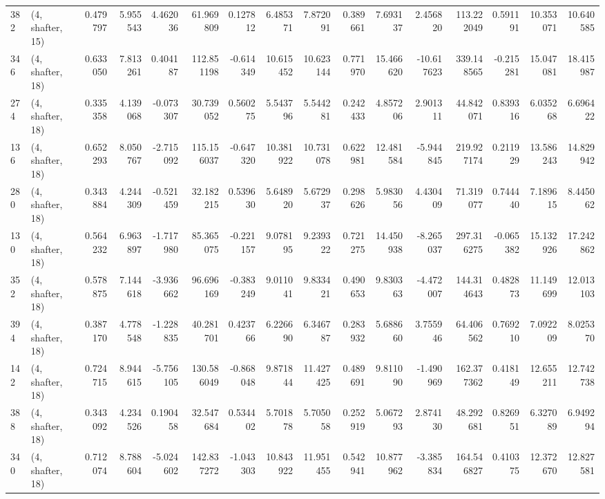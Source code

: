 \begin{tabular}{llrrrrrrrrrrrrrr}
382 &  (4, shafter, 15) &   0.479797 &   5.955543 &   4.462036 &    61.969809 &   0.127812 &   6.485371 &   7.872091 &  0.389661 &   7.693137 &   2.456820 &   113.222049 &  0.591191 &  10.353071 &  10.640585 \\
346 &  (4, shafter, 18) &   0.633050 &   7.813261 &   0.404187 &   112.851198 &  -0.614349 &  10.615452 &  10.623144 &  0.771970 &  15.466620 & -10.617623 &   339.148565 & -0.215281 &  15.047081 &  18.415987 \\
274 &  (4, shafter, 18) &   0.335358 &   4.139068 &  -0.073307 &    30.739052 &   0.560275 &   5.543796 &   5.544281 &  0.242433 &   4.857206 &   2.901311 &    44.842071 &  0.839316 &   6.035268 &   6.696422 \\
136 &  (4, shafter, 18) &   0.652293 &   8.050767 &  -2.715092 &   115.156037 &  -0.647320 &  10.381922 &  10.731078 &  0.622981 &  12.481584 &  -5.944845 &   219.927174 &  0.211929 &  13.586243 &  14.829942 \\
280 &  (4, shafter, 18) &   0.343884 &   4.244309 &  -0.521459 &    32.182215 &   0.539630 &   5.648920 &   5.672937 &  0.298626 &   5.983056 &   4.430409 &    71.319077 &  0.744440 &   7.189615 &   8.445062 \\
130 &  (4, shafter, 18) &   0.564232 &   6.963897 &  -1.717980 &    85.365075 &  -0.221157 &   9.078195 &   9.239322 &  0.721275 &  14.450938 &  -8.265037 &   297.316275 & -0.065382 &  15.132926 &  17.242862 \\
352 &  (4, shafter, 18) &   0.578875 &   7.144618 &  -3.936662 &    96.696169 &  -0.383249 &   9.011041 &   9.833421 &  0.490653 &   9.830363 &  -4.472007 &   144.314643 &  0.482873 &  11.149699 &  12.013103 \\
394 &  (4, shafter, 18) &   0.387170 &   4.778548 &  -1.228835 &    40.281701 &   0.423766 &   6.226690 &   6.346787 &  0.283932 &   5.688660 &   3.755946 &    64.406562 &  0.769210 &   7.092209 &   8.025370 \\
142 &  (4, shafter, 18) &   0.724715 &   8.944615 &  -5.756105 &   130.586049 &  -0.868048 &   9.871844 &  11.427425 &  0.489691 &   9.811090 &  -1.490969 &   162.377362 &  0.418149 &  12.655211 &  12.742738 \\
388 &  (4, shafter, 18) &   0.343092 &   4.234526 &   0.190458 &    32.547684 &   0.534402 &   5.701878 &   5.705058 &  0.252919 &   5.067293 &   2.874130 &    48.292681 &  0.826951 &   6.327089 &   6.949294 \\
340 &  (4, shafter, 18) &   0.712074 &   8.788604 &  -5.024602 &   142.837272 &  -1.043303 &  10.843922 &  11.951455 &  0.542941 &  10.877962 &  -3.385834 &   164.546827 &  0.410375 &  12.372670 &  12.827581 \\

\end{tabular}
